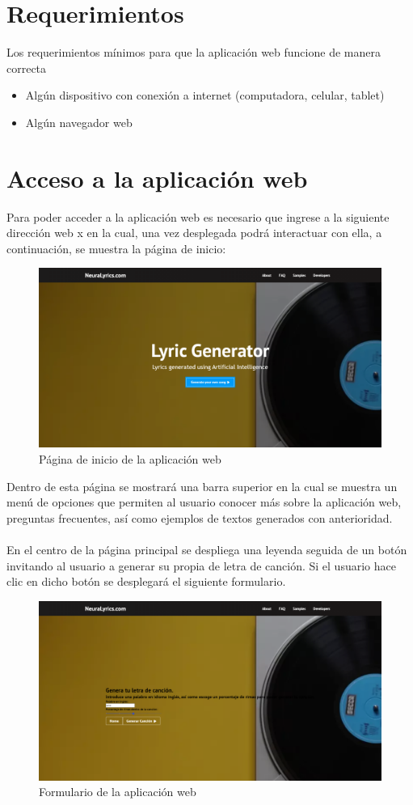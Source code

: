 \documentclass[12pt, a4paper, titlepage]{article}
\begin{document}
	\section{Requerimientos}
	Los requerimientos mínimos para que la aplicación web funcione de manera correcta
	\begin{itemize}
		\item Algún dispositivo con conexión a internet (computadora, celular, tablet)
		\item Algún navegador web
	\end{itemize}

	\section{Acceso a la aplicación web}
	Para poder acceder a la aplicación web es necesario que ingrese a la siguiente dirección web x en la cual, una vez desplegada podrá interactuar con ella, a continuación, se muestra la página de inicio:
	\begin{figure}[H] 
		\includegraphics[width=13.5cm]{./Imagenes/Capturas/pprincipal.png}
		\centering \caption{Página de inicio de la aplicación web}
	\end{figure}
	Dentro de esta página se mostrará una barra superior en la cual se muestra un menú de opciones que permiten al usuario conocer más sobre la aplicación web, preguntas frecuentes, así como ejemplos de textos generados con anterioridad.\\\\
	En el centro de la página principal se despliega una leyenda seguida de un botón invitando al usuario a generar su propia de letra de canción. Si el usuario hace clic en dicho botón se desplegará el siguiente formulario.
	\begin{figure}[H] 
		\includegraphics[width=13.5cm]{./Imagenes/Capturas/pformulario.png}
		\centering \caption{Formulario de la aplicación web}
	\end{figure}
\end{document}
